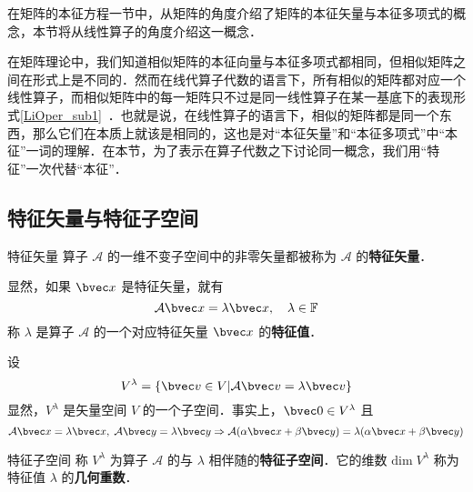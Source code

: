 在矩阵的本征方程一节中，从矩阵的角度介绍了矩阵的本征矢量与本征多项式的概念，本节将从线性算子的角度介绍这一概念．

在矩阵理论中，我们知道相似矩阵的本征向量与本征多项式都相同，但相似矩阵之间在形式上是不同的．然而在线代算子代数的语言下，所有相似的矩阵都对应一个线性算子，而相似矩阵中的每一矩阵只不过是同一线性算子在某一基底下的表现形式\autoref{LiOper_sub1}~．也就是说，在线性算子的语言下，相似的矩阵都是同一个东西，那么它们在本质上就该是相同的，这也是对“本征矢量”和“本征多项式”中“本征”一词的理解．在本节，为了表示在算子代数之下讨论同一概念，我们用“特征”一次代替“本征”．
\subsection{特征矢量与特征子空间}
\begin{definition}{特征矢量}
算子 $\mathcal{A}$ 的一维不变子空间中的非零矢量都被称为 $\mathcal{A}$ 的\textbf{特征矢量}．
\end{definition}
显然，如果 $\bvec x$ 是特征矢量，就有
\begin{equation}
\mathcal{A}\bvec x=\lambda \bvec x,\quad \lambda\in\mathbb{F}
\end{equation}
称 $\lambda$ 是算子 $\mathcal{A}$ 的一个对应特征矢量 $\bvec x$ 的\textbf{特征值}．

设
\begin{equation}
V^{\lambda}=\{\bvec v\in V|\mathcal{A}\bvec v=\lambda \bvec v\}
\end{equation}
显然，$V^{\lambda}$ 是矢量空间 $V$ 的一个子空间．事实上，$\bvec 0\in V^{\lambda}$ 且
\begin{equation}
\mathcal{A}\bvec x=\lambda \bvec x,\;\mathcal{A}\bvec y=\lambda \bvec y\Rightarrow\mathcal{A}(\alpha\bvec x+\beta\bvec y)=\lambda(\alpha\bvec x+\beta \bvec y)
\end{equation}
\begin{definition}{特征子空间}
称 $V^{\lambda}$ 为算子 $\mathcal{A}$ 的与 $\lambda$ 相伴随的\textbf{特征子空间}．它的维数 $\mathrm{dim}\;V^{\lambda}$ 称为特征值 $\lambda$ 的\textbf{几何重数}． 
\end{definition}
